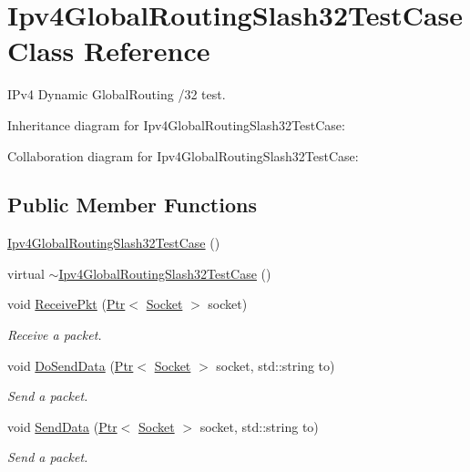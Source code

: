 \hypertarget{classIpv4GlobalRoutingSlash32TestCase}{}\section{Ipv4\+Global\+Routing\+Slash32\+Test\+Case Class Reference}
\label{classIpv4GlobalRoutingSlash32TestCase}


I\+Pv4 Dynamic Global\+Routing /32 test.  




Inheritance diagram for Ipv4\+Global\+Routing\+Slash32\+Test\+Case\+:


Collaboration diagram for Ipv4\+Global\+Routing\+Slash32\+Test\+Case\+:
\subsection*{Public Member Functions}
\begin{DoxyCompactItemize}
\item 
\hyperlink{classIpv4GlobalRoutingSlash32TestCase_ad9450116fb577651132dce234d9cadda}{Ipv4\+Global\+Routing\+Slash32\+Test\+Case} ()
\item 
virtual \hyperlink{classIpv4GlobalRoutingSlash32TestCase_a6e968e28df4c219ec14bb0103ed47745}{$\sim$\+Ipv4\+Global\+Routing\+Slash32\+Test\+Case} ()
\item 
void \hyperlink{classIpv4GlobalRoutingSlash32TestCase_a06786cf1bd29354451ca3303c1b3f2d7}{Receive\+Pkt} (\hyperlink{classns3_1_1Ptr}{Ptr}$<$ \hyperlink{classns3_1_1Socket}{Socket} $>$ socket)
\begin{DoxyCompactList}\small\item\em Receive a packet. \end{DoxyCompactList}\item 
void \hyperlink{classIpv4GlobalRoutingSlash32TestCase_ae2fe792c3efae6607084555c2b55fdb3}{Do\+Send\+Data} (\hyperlink{classns3_1_1Ptr}{Ptr}$<$ \hyperlink{classns3_1_1Socket}{Socket} $>$ socket, std\+::string to)
\begin{DoxyCompactList}\small\item\em Send a packet. \end{DoxyCompactList}\item 
void \hyperlink{classIpv4GlobalRoutingSlash32TestCase_a4d39b47fdcbf5ec410a8e2810fdea618}{Send\+Data} (\hyperlink{classns3_1_1Ptr}{Ptr}$<$ \hyperlink{classns3_1_1Socket}{Socket} $>$ socket, std\+::string to)
\begin{DoxyCompactList}\small\item\em Send a packet. \end{DoxyCompactList}\end{DoxyCompactItemize}

